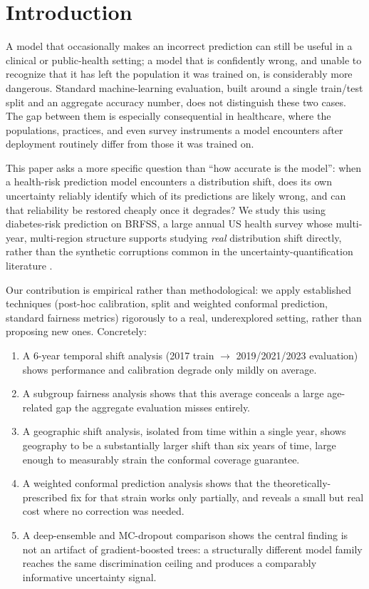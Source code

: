 \documentclass[11pt]{article}
\begin{document}
\section{Introduction}

A model that occasionally makes an incorrect prediction can still be useful in a clinical or public-health setting; a model that is confidently wrong, and unable to recognize that it has left the population it was trained on, is considerably more dangerous. Standard machine-learning evaluation, built around a single train/test split and an aggregate accuracy number, does not distinguish these two cases. The gap between them is especially consequential in healthcare, where the populations, practices, and even survey instruments a model encounters after deployment routinely differ from those it was trained on.

This paper asks a more specific question than ``how accurate is the model'': when a health-risk prediction model encounters a distribution shift, does its own uncertainty reliably identify which of its predictions are likely wrong, and can that reliability be restored cheaply once it degrades? We study this using diabetes-risk prediction on BRFSS, a large annual US health survey whose multi-year, multi-region structure supports studying \emph{real} distribution shift directly, rather than the synthetic corruptions common in the uncertainty-quantification literature \citep{ovadia2019trust,koh2021wilds}.

Our contribution is empirical rather than methodological: we apply established techniques (post-hoc calibration, split and weighted conformal prediction, standard fairness metrics) rigorously to a real, underexplored setting, rather than proposing new ones. Concretely:

\begin{enumerate}[leftmargin=*]
\item A 6-year temporal shift analysis (2017 train $\to$ 2019/2021/2023 evaluation) shows performance and calibration degrade only mildly on average.
\item A subgroup fairness analysis shows that this average conceals a large age-related gap the aggregate evaluation misses entirely.
\item A geographic shift analysis, isolated from time within a single year, shows geography to be a substantially larger shift than six years of time, large enough to measurably strain the conformal coverage guarantee.
\item A weighted conformal prediction analysis shows that the theoretically-prescribed fix for that strain works only partially, and reveals a small but real cost where no correction was needed.
\item A deep-ensemble and MC-dropout comparison shows the central finding is not an artifact of gradient-boosted trees: a structurally different model family reaches the same discrimination ceiling and produces a comparably informative uncertainty signal.
\end{enumerate}
\end{document}
